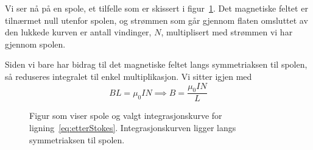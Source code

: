 \documentclass[a4paper,11pt, twocolumn]{article}
\begin{document}
Vi ser nå på en spole, et tilfelle som er skissert i figur~\ref{fig:spole}. Det magnetiske feltet er tilnærmet null utenfor spolen, og strømmen som går gjennom flaten omsluttet av den lukkede kurven er antall vindinger, $N$, multiplisert med strømmen vi har gjennom spolen.

Siden vi bare har bidrag til det magnetiske feltet langs symmetriaksen til spolen, så reduseres integralet til enkel multiplikasjon. Vi sitter igjen med
\begin{equation}
	BL = \mu_0IN \implies B = \frac{\mu_0 I N}{L}
	\label{eq:magSpole}
\end{equation}

\begin{figure}[!ht]
	\centering

	\caption{Figur som viser spole og valgt integrasjonskurve for ligning~\ref{eq:etterStokes}. Integrasjonskurven ligger langs symmetriaksen til spolen.} 
	\label{fig:spole}
\end{figure}
\end{document}
